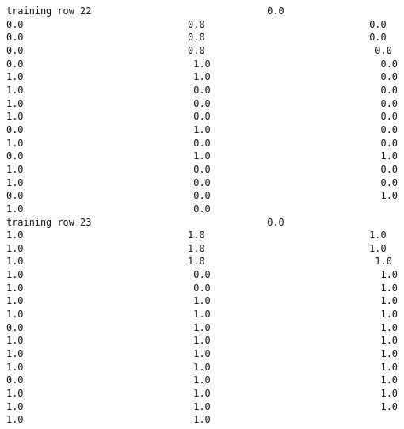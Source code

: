 \documentclass[11pt]{article}
\begin{document}
\begin{verbatim}
training row 22                               0.0                             0.0                             0.0                             0.0                             0.0                             0.0                             0.0                             0.0                             0.0                              0.0                              0.0                              1.0                              0.0                              1.0                              1.0                              0.0                              1.0                              0.0                              0.0                              1.0                              0.0                              0.0                              1.0                              0.0                              0.0                              0.0                              1.0                              0.0                              1.0                              0.0                              0.0                              0.0                              1.0                              1.0                              1.0                              0.0                              0.0                              1.0                              0.0                              0.0                              0.0                              0.0                              1.0                              1.0                              0.0
training row 23                               0.0                             1.0                             1.0                             1.0                             1.0                             1.0                             1.0                             1.0                             1.0                              1.0                              1.0                              0.0                              1.0                              1.0                              0.0                              1.0                              1.0                              1.0                              1.0                              1.0                              1.0                              1.0                              0.0                              1.0                              1.0                              1.0                              1.0                              1.0                              1.0                              1.0                              1.0                              1.0                              1.0                              1.0                              0.0                              1.0                              1.0                              1.0                              1.0                              1.0                              1.0                              1.0                              1.0                              1.0                              1.0

\end{verbatim}
\end{document}
